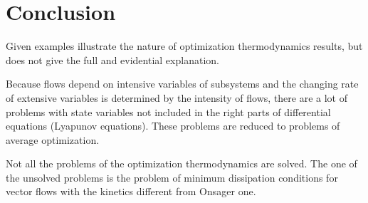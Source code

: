 \documentclass[epjST]{svjour}
\begin{document}
\section*{Conclusion}

Given examples illustrate the nature of optimization thermodynamics results, but does not give the full and evidential explanation.

Because flows depend on intensive variables of subsystems and the changing rate of extensive variables is determined by the intensity of flows, there are a lot of problems with state variables not included in the right parts of differential equations (Lyapunov equations). These problems are reduced to problems of average optimization.

Not all the problems of the optimization thermodynamics are solved. The one of the unsolved problems is the problem of minimum dissipation conditions for vector flows with the kinetics different from Onsager one.
%
\end{document}
